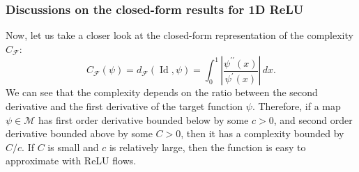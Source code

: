\documentclass[12pt]{amsart}
\numberwithin{equation}{section}
\theoremstyle{remark}
\begin{document}



\subsubsection{Discussions on the closed-form results for 1D ReLU}
Now, let us take a closer look at the closed-form representation of the complexity $C_{\mathcal F}$:
\begin{equation}
    C_{\mathcal F}(\psi) = d_{\mathcal F}(\operatorname{Id}, \psi) = \int_0^1 \left|\frac{\psi^{\prime\prime}(x)}{\psi^\prime(x)}\right|\, dx.
\end{equation}
We can see that the complexity depends on the ratio between the second derivative and the first derivative of the target function $\psi$. Therefore, if a map $\psi\in \mathcal M$ has first order derivative bounded below by some $c>0$, and second order derivative bounded above by some $C>0$, then it has a complexity bounded by $C/c$. If $C$ is small and $c$ is relatively large, then the function is easy to approximate with ReLU flows.
\end{document}
